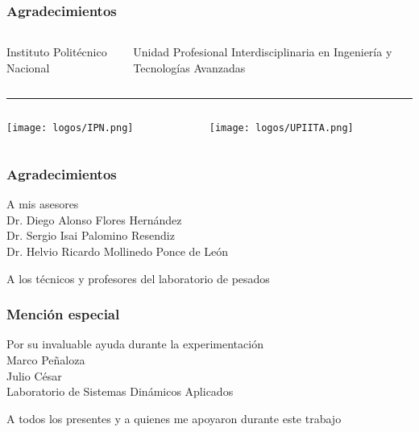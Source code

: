 
\begin{frame}[noframenumbering]
	\frametitle{Agradecimientos}
	\begin{columns}
		\begin{column}{0.5\textwidth}
			\centering Instituto Politécnico Nacional
		\end{column}
		\begin{column}{0.5\textwidth}
			\centering Unidad Profesional Interdisciplinaria en Ingeniería y Tecnologías Avanzadas
		\end{column}
	\end{columns}
	\vspace*{2mm}
	\noindent\rule{\textwidth}{1pt}
	\vspace*{5mm}
	\begin{columns}
		\begin{column}{0.5\textwidth}
			\centering
			\texttt{[image: logos/IPN.png]}
		\end{column}
		\begin{column}{0.5\textwidth}
			\centering
			\texttt{[image: logos/UPIITA.png]}
		\end{column}
	\end{columns}
\end{frame}	

\begin{frame}[noframenumbering]
	\frametitle{Agradecimientos}
	\centering
	
	{\Large A mis asesores}\\
	\vspace*{5mm}
	Dr. Diego Alonso Flores Hernández\\[2mm]
	Dr. Sergio Isai Palomino Resendiz\\[2mm]
	Dr. Helvio Ricardo Mollinedo Ponce de León
	\vspace*{15mm}
	
	{\Large A los técnicos y profesores del laboratorio de pesados}
\end{frame}

\begin{frame}[noframenumbering]
	\frametitle{Mención especial}
	\centering
	
	{\Large Por su invaluable ayuda durante la experimentación}\\
	\vspace*{5mm}
	Marco Peñaloza\\[2mm]
	Julio César\\[2mm]
	Laboratorio de Sistemas Dinámicos Aplicados
	\vspace*{15mm}	
	
	{\Large A todos los presentes y a quienes me apoyaron durante este trabajo}
\end{frame}